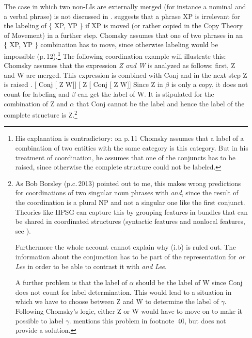 The case in which two non-LIs are externally merged (for instance a nominal
and a verbal phrase) is not discussed in . \citet[--44]{Chomsky2013a}
suggests that a phrase XP is irrelevant for the labeling of \{ XP, YP \} if XP is moved (or rather
copied in the Copy Theory of Movement) in a further step. Chomsky assumes that one of two phrases in
an \{ XP, YP \} combination has to move, since otherwise labeling would be impossible (p.\,12).\footnote{\label{fn-labeling-gleiche-Kategorie}%
  His explanation is contradictory: on p.\,11 Chomsky assumes that a label of a combination of
  two entities with the same category is this category. But in his treatment of coordination, he
  assumes that one of the conjuncts has to be raised, since otherwise the complete structure could not be labeled.
}
The following coordination example will illustrate this: Chomsky assumes that the expression \emph{Z
  and W} is analyzed as follows: first, Z and W are merged. This expression is combined with Conj
   and in the next step Z is raised . 
\eal
\label{Chomsky-problems-of-projection-coordination}
\ex\label{ex-coord-a} {}[\sub{$\alpha$} Conj [\sub{$\beta$} Z W]]
\ex\label{ex-coord-b} {}[\sub{$\gamma$} Z [\sub{$\alpha$} Conj [\sub{$\beta$} Z W]]
\zl
Since Z in $\beta$ is only a copy, it does not count for labeling and $\beta$ can get the label
of W. It is stipulated for the combination of Z and $\alpha$ that Conj cannot be the label and hence
the label of the complete structure is Z.\footnote{%
    As Bob Borsley (p.c.\,2013) pointed out to me, this makes wrong predictions for coordinations of
    two singular noun phrases with \emph{and}, since the result of the coordination is a plural NP
    and not a singular one like the first conjunct. Theories like HPSG can capture this by grouping
    features in bundles that can be shared in coordinated structures (syntactic features and
    nonlocal features, see ).

Furthermore the whole account cannot explain why (i.b) is ruled out.
\eal
\zl
The information about the conjunction has to be part of the representation for \emph{or Lee} in
order to be able to contrast it with \emph{and Lee}. 

A further problem is that the label of $\alpha$ should be the label of W since Conj does not count
for label determination. This would lead to a situation in which we have to choose between Z and W
to determine the label of $\gamma$. Following Chomsky's logic, either Z or W would have to move on to
make it possible to label $\gamma$. \citet{Chomsky2013a} mentions this problem in footnote~40, but does not provide a solution.
}

